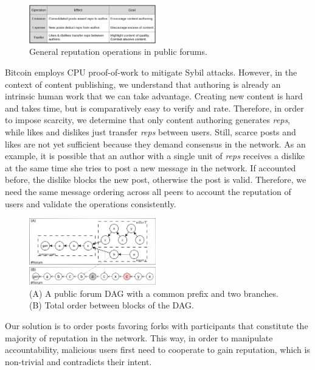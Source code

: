 \documentclass[10pt,journal,compsoc]{IEEEtran}
\newcommand{\reps}     {\emph{reps}\xspace}
\begin{document}
\begin{figure}
\centering
\includegraphics[width=0.49\textwidth]{general.png}
\caption{General reputation operations in public forums.}
\label{fig.general}
\end{figure}

Bitcoin employs CPU proof-of-work to mitigate Sybil attacks.
However, in the context of content publishing, we understand that authoring is
already an intrinsic human work that we can take advantage.
Creating new content is hard and takes time, but is comparatively easy to
verify and rate.
Therefore, in order to impose scarcity, we determine that only content
authoring generates \reps, while likes and dislikes just transfer \reps between
users.
%
Still, scarce posts and likes are not yet sufficient because they demand
consensus in the network.
As an example, it is possible that an author with a single unit of \reps
receives a dislike at the same time she tries to post a new message in the
network.
If accounted before, the dislike blocks the new post, otherwise the post is
valid.
Therefore, we need the same message ordering across all peers to account the
reputation of users and validate the operations consistently.

\begin{figure}
\centering
\includegraphics[width=0.49\textwidth]{reps2.png}
\caption{
    (A) A public forum DAG with a common prefix and two branches.
    (B) Total order between blocks of the DAG.
}
\label{fig.reps}
\end{figure}

Our solution is to order posts favoring forks with participants that constitute
the majority of reputation in the network.
This way, in order to manipulate accountability, malicious users first need to
cooperate to gain reputation, which is non-trivial and contradicts their
intent.
\end{document}
